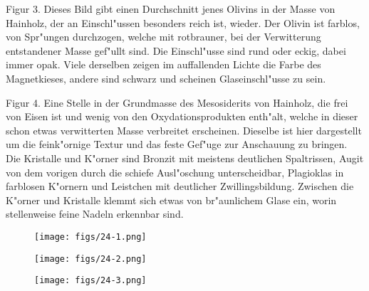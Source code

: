 \documentclass[a4paper, 11pt, oneside, polutonikogreek, german]{article}
\begin{document}
Figur 3. Dieses Bild gibt einen Durchschnitt jenes Olivins in der Masse von Hainholz, der an Einschl"ussen besonders reich ist, wieder. Der Olivin ist farblos, von Spr"ungen durchzogen, welche mit rotbrauner, bei der Verwitterung entstandener Masse gef"ullt sind. Die Einschl"usse sind rund oder eckig, dabei immer opak. Viele derselben zeigen im auffallenden Lichte die Farbe des Magnetkieses, andere sind schwarz und scheinen Glaseinschl"usse zu sein.

Figur 4. Eine Stelle in der Grundmasse des Mesosiderits von Hainholz, die frei von Eisen ist und wenig von den Oxydationsprodukten enth"alt, welche in dieser schon etwas verwitterten Masse verbreitet erscheinen. Dieselbe ist hier dargestellt um die feink"ornige Textur und das feste Gef"uge zur Anschauung zu bringen. Die Kristalle und K"orner sind Bronzit mit meistens deutlichen Spaltrissen, Augit von dem vorigen durch die schiefe Ausl"oschung unterscheidbar, Plagioklas in farblosen K"ornern und Leistchen mit deutlicher Zwillingsbildung. Zwischen die K"orner und Kristalle klemmt sich etwas von br"aunlichem Glase ein, worin stellenweise feine Nadeln erkennbar sind.
\clearpage

\vspace*{\fill}
\begin{figure}[H]
\centering
\texttt{[image: figs/24-1.png]}
\caption{}
\end{figure}
\vspace*{\fill}
\clearpage

\vspace*{\fill}
\begin{figure}[H]
\centering
\texttt{[image: figs/24-2.png]}
\caption{}
\end{figure}
\vspace*{\fill}
\clearpage

\vspace*{\fill}
\begin{figure}[H]
\centering
\texttt{[image: figs/24-3.png]}
\caption{}
\end{figure}
\vspace*{\fill}
\clearpage
\end{document}
